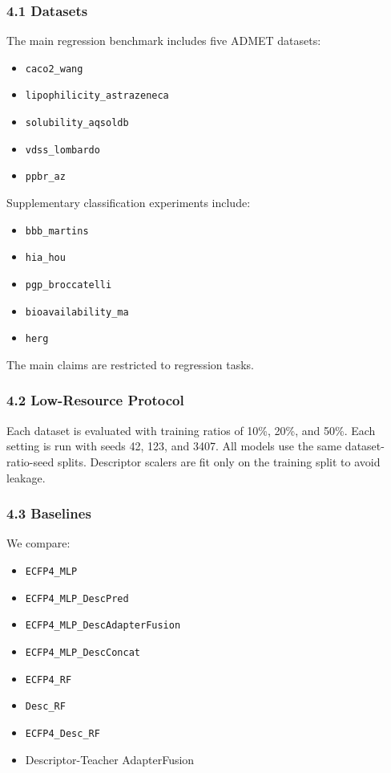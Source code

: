 \documentclass[
]{article}
\providecommand{\tightlist}{%
  \setlength{\itemsep}{0pt}\setlength{\parskip}{0pt}}
\begin{document}
\subsubsection{4.1 Datasets}\label{datasets}

The main regression benchmark includes five ADMET datasets:

\begin{itemize}
\tightlist
\item
  \texttt{caco2\_wang}
\item
  \texttt{lipophilicity\_astrazeneca}
\item
  \texttt{solubility\_aqsoldb}
\item
  \texttt{vdss\_lombardo}
\item
  \texttt{ppbr\_az}
\end{itemize}

Supplementary classification experiments include:

\begin{itemize}
\tightlist
\item
  \texttt{bbb\_martins}
\item
  \texttt{hia\_hou}
\item
  \texttt{pgp\_broccatelli}
\item
  \texttt{bioavailability\_ma}
\item
  \texttt{herg}
\end{itemize}

The main claims are restricted to regression tasks.

\subsubsection{4.2 Low-Resource Protocol}\label{low-resource-protocol}

Each dataset is evaluated with training ratios of 10\%, 20\%, and 50\%.
Each setting is run with seeds 42, 123, and 3407. All models use the
same dataset-ratio-seed splits. Descriptor scalers are fit only on the
training split to avoid leakage.

\subsubsection{4.3 Baselines}\label{baselines}

We compare:

\begin{itemize}
\tightlist
\item
  \texttt{ECFP4\_MLP}
\item
  \texttt{ECFP4\_MLP\_DescPred}
\item
  \texttt{ECFP4\_MLP\_DescAdapterFusion}
\item
  \texttt{ECFP4\_MLP\_DescConcat}
\item
  \texttt{ECFP4\_RF}
\item
  \texttt{Desc\_RF}
\item
  \texttt{ECFP4\_Desc\_RF}
\item
  Descriptor-Teacher AdapterFusion
\end{itemize}
\end{document}
